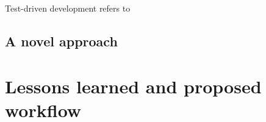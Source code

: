 Test-driven development refers to


\subsection{A novel approach}
\label{sec:equivalence-polyglotest}







\section{Lessons learned and proposed workflow}
\label{sec:translation-workflow}
